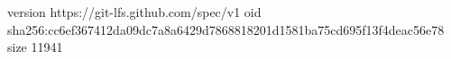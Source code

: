 version https://git-lfs.github.com/spec/v1
oid sha256:cc6ef367412da09dc7a8a6429d7868818201d1581ba75cd695f13f4deac56e78
size 11941
